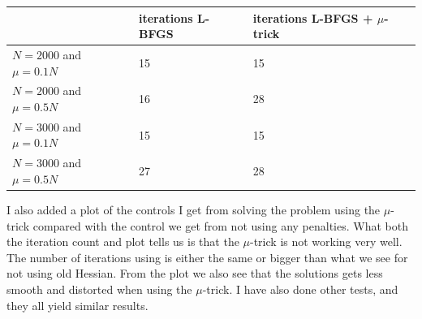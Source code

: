 \documentclass[11pt,a4paper]{article}
\begin{document}
\begin{center}
    \begin{tabular}{| l | l | l |}
    \hline
     & iterations L-BFGS & iterations  L-BFGS + $\mu$-trick \\ \hline
    $N=2000$ and $\mu=0.1N$ &  15 & 15 \\ \hline
    $N=2000$ and $\mu=0.5N$&  16 &  28	\\ \hline
    $N=3000$ and $\mu=0.1N$ &  15 & 15 \\ \hline
    $N=3000$ and $\mu=0.5N$&  27 &  28	\\ \hline
    \end{tabular}
\end{center}
I also added a plot of the controls I get from solving the problem using the $\mu$-trick compared with the control we get from not using any penalties. What both the iteration count and plot tells us is that the $\mu$-trick is not working very well. The number of iterations using is either the same or bigger than what we see for not using old Hessian. From the plot we also see that the solutions gets less smooth and distorted when using the $\mu$-trick. I have also done other tests, and they all yield similar results.


\end{document}
